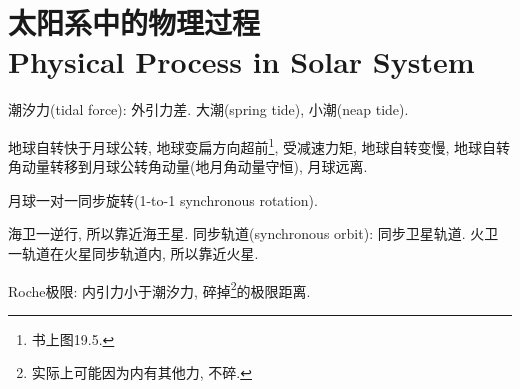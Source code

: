 \chapter{太阳系中的物理过程\\Physical Process in Solar System}

潮汐力(tidal force): 外引力差. 大潮(spring tide), 小潮(neap tide).

地球自转快于月球公转, 地球变扁方向超前\footnote{书上图19.5.}, 受减速力矩, 地球自转变慢, 地球自转角动量转移到月球公转角动量(地月角动量守恒), 月球远离.

月球一对一同步旋转(1-to-1 synchronous rotation).

海卫一逆行, 所以靠近海王星. 同步轨道(synchronous orbit): 同步卫星轨道. 火卫一轨道在火星同步轨道内, 所以靠近火星.

Roche极限: 内引力小于潮汐力, 碎掉\footnote{实际上可能因为内有其他力, 不碎.}的极限距离.
